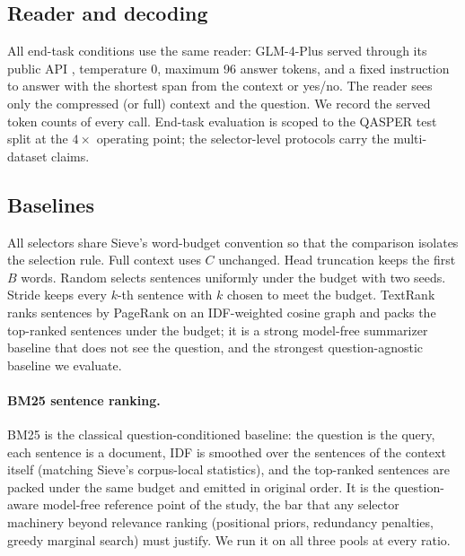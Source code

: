 \documentclass[pdflatex,sn-basic]{sn-jnl}
\theoremstyle{remark}
\newcommand{\method}{Sieve}
\begin{document}
\subsection{Reader and decoding}
All end-task conditions use the same reader: GLM-4-Plus served through
its public API \citep{glm2024chatglm}, temperature $0$, maximum 96
answer tokens, and a fixed instruction to answer with the shortest
span from the context or yes/no. The reader sees only the compressed
(or full) context and the question. We record the served token counts
of every call. End-task evaluation is scoped to the QASPER test split
at the $4\times$ operating point; the selector-level protocols carry
the multi-dataset claims.

\subsection{Baselines}
\label{sec:baselines}
All selectors share \method{}'s word-budget convention so that the
comparison isolates the selection rule. Full context uses $C$
unchanged. Head truncation keeps the first $B$ words. Random selects
sentences uniformly under the budget with two seeds. Stride keeps
every $k$-th sentence with $k$ chosen to meet the budget. TextRank
\citep{mihalcea2004textrank} ranks sentences by PageRank on an
IDF-weighted cosine graph and packs the top-ranked sentences under the
budget; it is a strong model-free summarizer baseline that does not see
the question, and the strongest question-agnostic baseline we evaluate.

\paragraph{BM25 sentence ranking.}
BM25 \citep{robertson2009bm25} is the classical question-conditioned
baseline: the question is the query, each sentence is a document, IDF
is smoothed over the sentences of the context itself (matching
\method{}'s corpus-local statistics), and the top-ranked sentences are
packed under the same budget and emitted in original order. It is the
question-aware model-free reference point of the study, the bar that
any selector machinery beyond relevance ranking
(positional priors, redundancy penalties, greedy marginal search)
must justify. We run it on all three pools at every ratio.
\end{document}
